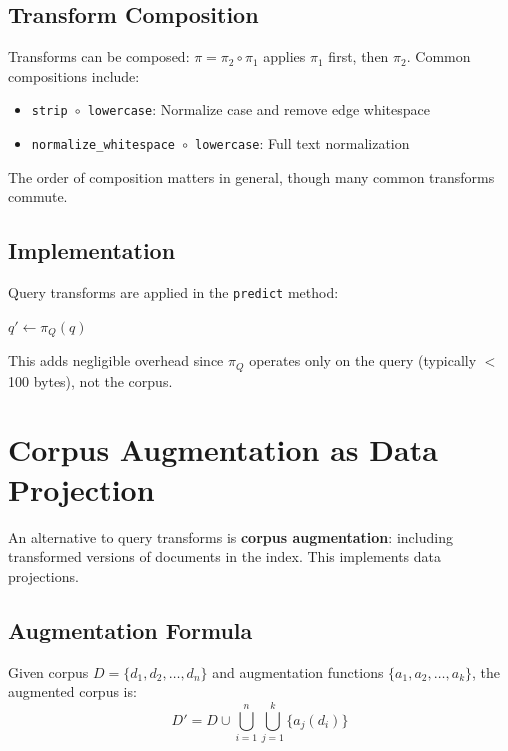 \documentclass[11pt]{article}
\begin{document}
\subsection{Transform Composition}

Transforms can be composed: $\pi = \pi_2 \circ \pi_1$ applies $\pi_1$ first, then $\pi_2$. Common compositions include:

\begin{itemize}
    \item \texttt{strip $\circ$ lowercase}: Normalize case and remove edge whitespace
    \item \texttt{normalize\_whitespace $\circ$ lowercase}: Full text normalization
\end{itemize}

The order of composition matters in general, though many common transforms commute.

\subsection{Implementation}

Query transforms are applied in the \texttt{predict} method:

\begin{algorithmic}[1]
    \State $q' \gets \pi_Q(q)$
    \State \Return {}
\EndFunction
\end{algorithmic}

This adds negligible overhead since $\pi_Q$ operates only on the query (typically $<$100 bytes), not the corpus.

\section{Corpus Augmentation as Data Projection}

An alternative to query transforms is \textbf{corpus augmentation}: including transformed versions of documents in the index. This implements data projections.

\subsection{Augmentation Formula}

Given corpus $D = \{d_1, d_2, \ldots, d_n\}$ and augmentation functions $\{a_1, a_2, \ldots, a_k\}$, the augmented corpus is:
\begin{equation}
D' = D \cup \bigcup_{i=1}^{n} \bigcup_{j=1}^{k} \{a_j(d_i)\}
\end{equation}
\end{document}

